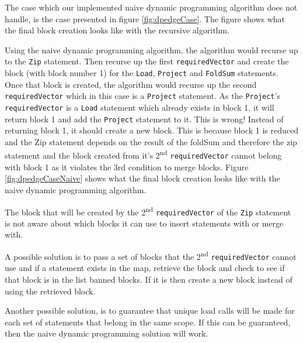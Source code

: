 The case which our implemented naive dynamic programming algorithm does not handle, is the case presented in figure \ref{fig:dpedgeCase}. The figure shows what the final block creation looks like with the recursive algorithm. 


Using the naive dynamic programming algorithm, the algorithm would recurse up to the \texttt{Zip} statement. Then recurse up the first \texttt{requiredVector} and create the block (with block number 1) for the \texttt{Load}, \texttt{Project} and \texttt{FoldSum} statements. Once that block is created, the algorithm would recurse up the second \texttt{requiredVector} which in this case is a \texttt{Project} statement. As the \texttt{Project}'s \texttt{requiredVector} is a \texttt{Load} statement which already exists in block 1, it will return block 1 and add the \texttt{Project} statement to it. This is wrong! Instead of returning block 1, it should create a new block. This is because block 1 is reduced and the Zip statement depends on the result of the foldSum and therefore the zip statement and the block created from it's 2\textsuperscript{nd} \texttt{requiredVector} cannot belong with block 1 as it violates the 3rd condition to merge blocks. Figure \ref{fig:dpedgeCaseNaive} shows what the final block creation looks like with the naive dynamic programming algorithm. 

The block that will be created by the 2\textsuperscript{nd} \texttt{requiredVector} of the \texttt{Zip} statement is not aware about which blocks it can use to insert statements with or merge with. 

A possible solution is to pass a set of blocks that the 2\textsuperscript{nd} \texttt{requiredVector} cannot use and if a statement exists in the map, retrieve the block and check to see if that block is in the list banned blocks. If it is then create a new block instead of using the retrieved block.

Another possible solution, is to guarantee that unique load calls will be made for each set of statements that belong in the same scope. If this can be guaranteed, then the naive dynamic programming solution will work.

